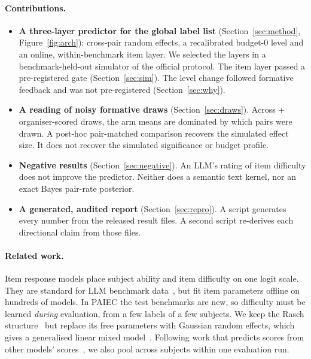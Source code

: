 \documentclass{article}
\begin{document}
\paragraph{Contributions.}
\begin{itemize}
\item \textbf{A three-layer predictor for the global label list} (Section~\ref{sec:method}, Figure~\ref{fig:arch}): cross-pair random effects, a recalibrated budget-0 level and an online, within-benchmark item layer. We selected the layers in a benchmark-held-out simulator of the official protocol. The item layer passed a pre-registered gate (Section~\ref{sec:sim}). The level change followed formative feedback and was not pre-registered (Section~\ref{sec:why}).
\item \textbf{A reading of noisy formative draws} (Section~\ref{sec:draws}). Across \ArBaseN{} + \ArWtwoN{} organiser-scored draws, the arm means are dominated by which pairs were drawn. A post-hoc pair-matched comparison recovers the simulated effect size. It does not recover the simulated significance or budget profile.
\item \textbf{Negative results} (Section~\ref{sec:negative}). An LLM's rating of item difficulty does not improve the predictor. Neither does a semantic text kernel, nor an exact Bayes pair-rate posterior.
\item \textbf{A generated, audited report} (Section~\ref{sec:repro}). A script generates every number from the released result files. A second script re-derives each directional claim from those files.
\end{itemize}

\paragraph{Related work.} Item response models place subject ability and item difficulty on one logit scale. They are standard for LLM benchmark data~\citep{rodriguez2021evaluation,polo2024tinybenchmarks,kipnis2025metabench}, but fit item parameters offline on hundreds of models. In PAIEC the test benchmarks are new, so difficulty must be learned \emph{during} evaluation, from a few labels of a few subjects. We keep the Rasch structure~\citep{lord1980} but replace its free parameters with Gaussian random effects, which gives a generalised linear mixed model~\citep{breslow1993}. Following work that predicts scores from other models' scores~\citep{ruan2024observational,ye2023predictable}, we also pool across subjects within one evaluation run.
\end{document}
